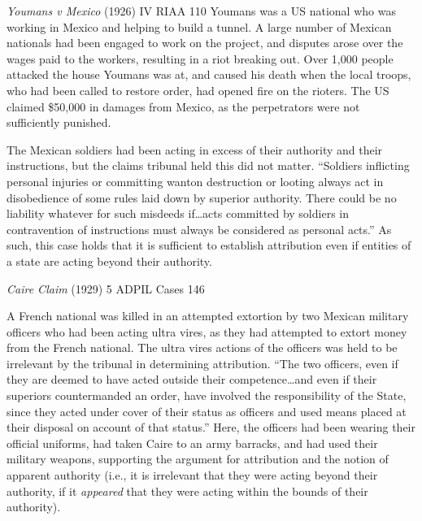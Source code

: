 \begin{casedetails}{\textit{Youmans v Mexico} (1926) IV RIAA 110}
    \flushleft
    Youmans was a US national who was working in Mexico and helping to build a tunnel. A large number of Mexican nationals had been engaged to work on the project, and disputes arose over the wages paid to the workers, resulting in a riot breaking out. Over 1,000 people attacked the house Youmans was at, and caused his death when the local troops, who had been called to restore order, had opened fire on the rioters. The US claimed \$50,000 in damages from Mexico, as the perpetrators were not sufficiently punished.

    \vspace{\baselineskip}

    The Mexican soldiers had been acting in excess of their authority and their instructions, but the claims tribunal held this did not matter. ``Soldiers inflicting personal injuries or committing wanton destruction or looting always act in disobedience of some rules laid down by superior authority. There could be no liability whatever for such misdeeds if…acts committed by soldiers in contravention of instructions must always be considered as personal acts.'' As such, this case holds that it is sufficient to establish attribution even if entities of a state are acting beyond their authority.
\end{casedetails}

\begin{casedetails}{\textit{Caire Claim} (1929) 5 ADPIL Cases 146}
    \flushleft

    A French national was killed in an attempted extortion by two Mexican military officers who had been acting \gls{ultra vires}, as they had attempted to extort money from the French national. The \gls{ultra vires} actions of the officers was held to be irrelevant by the tribunal in determining attribution. ``The two officers, even if they are deemed to have acted outside their competence…and even if their superiors countermanded an order, have involved the responsibility of the State, since they acted under cover of their status as officers and used means placed at their disposal on account of that status.'' Here, the officers had been wearing their official uniforms, had taken Caire to an army barracks, and had used their military weapons, supporting the argument for attribution and the notion of apparent authority (i.e., it is irrelevant that they were acting beyond their authority, if it \textit{appeared} that they were acting within the bounds of their authority).
\end{casedetails}

